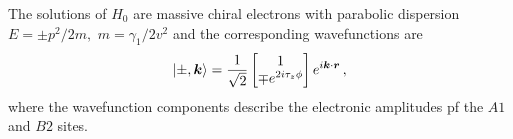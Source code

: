 The solutions of $H_0$ are massive chiral electrons with parabolic dispersion $E=\pm p^2/2m,\,\,m=\gamma_1/2v^2$ and the corresponding wavefunctions are
\begin{equation}
    \ket{\pm,\boldsymbol{k}}=
    \frac 1{\sqrt 2}
    \begin{bmatrix}
        1\\
        \mp e^{2i\tau_z\phi}
    \end{bmatrix}
    e^{i\boldsymbol{k}\cdot \boldsymbol{r}}\,,
    \label{eq:bilayer_eigenstates}
\end{equation}
where the wavefunction components describe the electronic amplitudes pf the $A1$ and $B2$ sites.